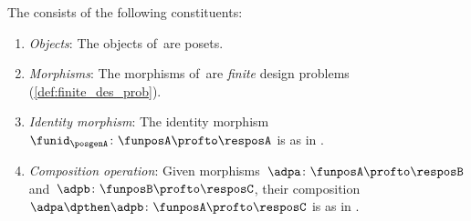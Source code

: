 \begin{definition}
    \label{def:DPfinite}
    The \emph{ \DPfinite} consists of the following constituents:
    \begin{enumerate}
        \item \emph{Objects}: The objects of~\DP are posets.
        \item \emph{Morphisms}: The morphisms of~\DP are \emph{finite} design problems (\cref{def:finite_des_prob}).
        \item \emph{Identity morphism}: The identity morphism~$\funid_\posgenA \colon \funposA \profto \resposA$ is as in \DP.
        \item \emph{Composition operation}: Given morphisms~$\adpa \colon  \funposA \profto \resposB$ and~$\adpb \colon \funposB \profto \resposC$, their composition~$\adpa \dpthen \adpb\colon \funposA\profto \resposC$ is as in \DP.
    \end{enumerate}
\end{definition}
